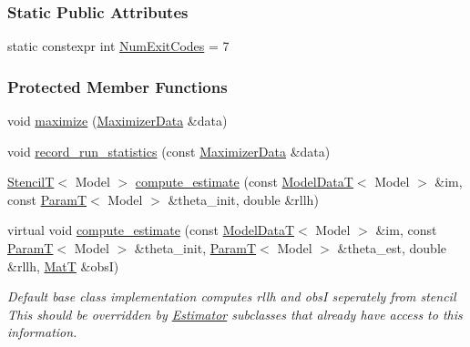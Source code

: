 \subsubsection*{Static Public Attributes}
\begin{DoxyCompactItemize}
\item 
static constexpr int \hyperlink{classmappel_1_1IterativeMaximizer_a04888d87aa205d54e7cae5a97d1c1e75}{Num\+Exit\+Codes} = 7
\end{DoxyCompactItemize}
\subsubsection*{Protected Member Functions}
\begin{DoxyCompactItemize}
\item 
void \hyperlink{classmappel_1_1NewtonMaximizer_aca7e3071f17ef6f381878eb6151c86d7}{maximize} (\hyperlink{classmappel_1_1NewtonMaximizer_af5da826cdff84efbe35e4268916fe810}{Maximizer\+Data} \&data)
\item 
void \hyperlink{classmappel_1_1IterativeMaximizer_af5614c292f139b5032b733a8d6fdf73e}{record\+\_\+run\+\_\+statistics} (const \hyperlink{classmappel_1_1NewtonMaximizer_af5da826cdff84efbe35e4268916fe810}{Maximizer\+Data} \&data)
\item 
\hyperlink{namespacemappel_a3a06598240007876f8c4bf834ad86197}{StencilT}$<$ Model $>$ \hyperlink{classmappel_1_1IterativeMaximizer_ad83f7b0a5b4d412f419b6089e73a66e0}{compute\+\_\+estimate} (const \hyperlink{namespacemappel_a97f050df953605381ae9c901c3b125f1}{Model\+DataT}$<$ Model $>$ \&im, const \hyperlink{namespacemappel_a667925cb0d6c0e49f2f035cc5a9a6857}{ParamT}$<$ Model $>$ \&theta\+\_\+init, double \&rllh)
\item 
virtual void \hyperlink{classmappel_1_1Estimator_aa46d86cfb5c336c9cb8c106da036d7d1}{compute\+\_\+estimate} (const \hyperlink{namespacemappel_a97f050df953605381ae9c901c3b125f1}{Model\+DataT}$<$ Model $>$ \&im, const \hyperlink{namespacemappel_a667925cb0d6c0e49f2f035cc5a9a6857}{ParamT}$<$ Model $>$ \&theta\+\_\+init, \hyperlink{namespacemappel_a667925cb0d6c0e49f2f035cc5a9a6857}{ParamT}$<$ Model $>$ \&theta\+\_\+est, double \&rllh, \hyperlink{namespacemappel_a7091ab87c528041f7e2027195fad8915}{MatT} \&obsI)
\begin{DoxyCompactList}\small\item\em Default base class implementation computes rllh and obsI seperately from stencil This should be overridden by \hyperlink{classmappel_1_1Estimator}{Estimator} subclasses that already have access to this information. \end{DoxyCompactList}\item 

\end{DoxyCompactItemize}
